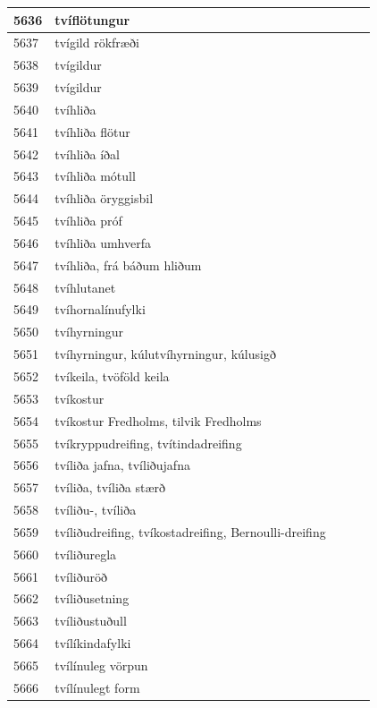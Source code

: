\begin{longtable}{p{}|p{}|p{}|p{}|p{}}
\hline
5636 & tvíflötungur &  &  &  \\
\hline
5637 & tvígild rökfræði &  &  &  \\
\hline
5638 & tvígildur &  &  &  \\
\hline
5639 & tvígildur &  &  &  \\
\hline
5640 & tvíhliða &  &  &  \\
\hline
5641 & tvíhliða flötur &  &  &  \\
\hline
5642 & tvíhliða íðal &  &  &  \\
\hline
5643 & tvíhliða mótull &  &  &  \\
\hline
5644 & tvíhliða öryggisbil &  &  &  \\
\hline
5645 & tvíhliða próf &  &  &  \\
\hline
5646 & tvíhliða umhverfa &  &  &  \\
\hline
5647 & tvíhliða, frá báðum hliðum &  &  &  \\
\hline
5648 & tvíhlutanet &  &  &  \\
\hline
5649 & tvíhornalínufylki &  &  &  \\
\hline
5650 & tvíhyrningur &  &  &  \\
\hline
5651 & tvíhyrningur, kúlutvíhyrningur, kúlusigð &  &  &  \\
\hline
5652 & tvíkeila, tvöföld keila &  &  &  \\
\hline
5653 & tvíkostur &  &  &  \\
\hline
5654 & tvíkostur Fredholms, tilvik Fredholms &  &  &  \\
\hline
5655 & tvíkryppudreifing, tvítindadreifing &  &  &  \\
\hline
5656 & tvíliða jafna, tvíliðujafna &  &  &  \\
\hline
5657 & tvíliða, tvíliða stærð &  &  &  \\
\hline
5658 & tvíliðu-, tvíliða &  &  &  \\
\hline
5659 & tvíliðudreifing, tvíkostadreifing, Bernoulli-dreifing &  &  &  \\
\hline
5660 & tvíliðuregla &  &  &  \\
\hline
5661 & tvíliðuröð &  &  &  \\
\hline
5662 & tvíliðusetning &  &  &  \\
\hline
5663 & tvíliðustuðull &  &  &  \\
\hline
5664 & tvílíkindafylki &  &  &  \\
\hline
5665 & tvílínuleg vörpun &  &  &  \\
\hline
5666 & tvílínulegt form &  &  &  \\

\end{longtable}
